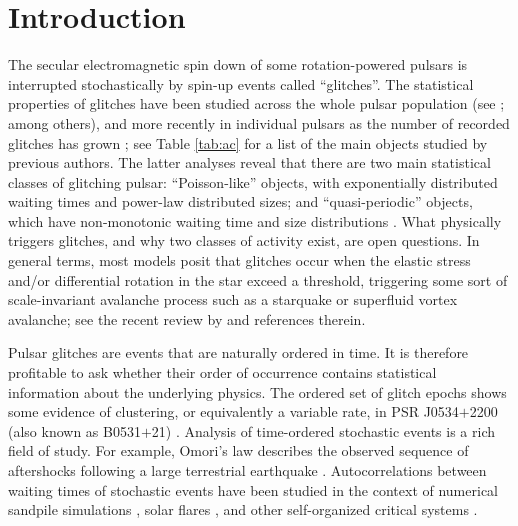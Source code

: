 \section{Introduction}
The secular electromagnetic spin down of some rotation-powered pulsars is interrupted stochastically by spin-up events called ``glitches''. The statistical properties of glitches have been studied across the whole pulsar population (see \citealp{Shemar1996, Lyne2000a, Fuentes2017}; among others), and more recently in individual pulsars as the number of recorded glitches has grown \citep{Melatos2008, Espinoza2011, Ashton2017, Howitt2018, Melatos2018}; see Table \ref{tab:ac} for a list of the main objects studied by previous authors. The latter analyses reveal that there are two main statistical classes of glitching pulsar:  ``Poisson-like'' objects, with exponentially distributed waiting times and power-law distributed sizes; and ``quasi-periodic'' objects, which have non-monotonic waiting time and size distributions \citep{Melatos2008, Espinoza2011, Howitt2018}. What physically triggers glitches, and why two classes of activity exist, are open questions. In general terms, most models posit that glitches occur when the elastic stress and/or differential rotation in the star exceed a threshold, triggering some sort of scale-invariant avalanche process such as a starquake or superfluid vortex avalanche; see the recent review by \citet{Haskell2015} and references therein. 

Pulsar glitches are events that are naturally ordered in time. It is therefore profitable to ask whether their order of occurrence contains statistical information about the underlying physics. The ordered set of glitch epochs shows some evidence of clustering, or equivalently a variable rate, in PSR J0534$+$2200 (also known as B0531$+$21) \citep{Lyne2015,Carlin2019clust}. Analysis of time-ordered stochastic events is a rich field of study. For example, Omori's law describes the observed sequence of aftershocks following a large terrestrial earthquake \citep{Utsu1995}. Autocorrelations between waiting times of stochastic events have been studied in the context of numerical sandpile simulations \citep{DeMenech2000, Santra2007}, solar flares \citep{Paczuski2005}, and other self-organized critical systems \citep{Caruso2007}. 

